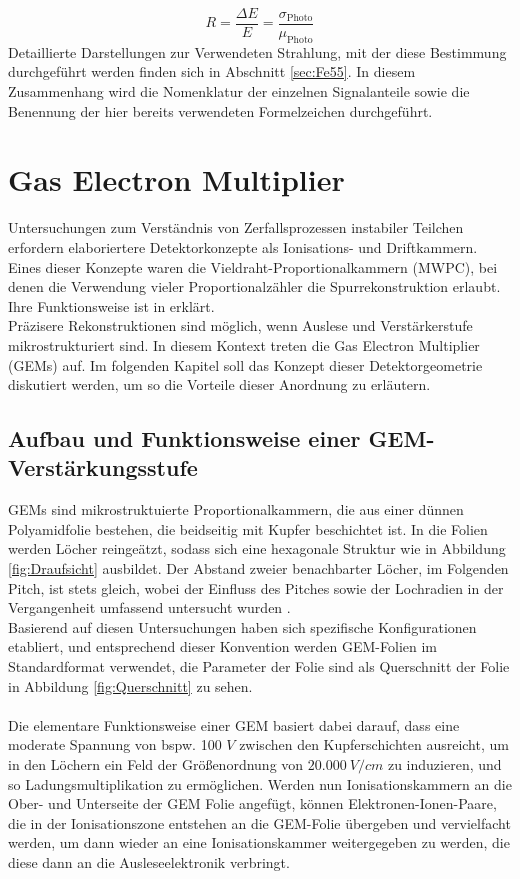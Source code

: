 				\begin{equation*}
					R=\frac{\Delta E}{E}= \frac{\sigma_{{\text{Photo}}}}{\mu_{\text{Photo}}}
				\end{equation*}
			Detaillierte Darstellungen zur Verwendeten Strahlung, mit der diese Bestimmung durchgeführt werden finden sich in Abschnitt  \ref{sec:Fe55}. In diesem Zusammenhang wird die Nomenklatur der einzelnen Signalanteile sowie die Benennung der hier bereits verwendeten Formelzeichen durchgeführt.
			
			

\chapter{Gas Electron Multiplier}
 Untersuchungen zum Verständnis von Zerfallsprozessen instabiler Teilchen erfordern elaboriertere Detektorkonzepte als Ionisations- und Driftkammern. Eines dieser Konzepte waren die Vieldraht-Proportionalkammern (MWPC), bei denen die Verwendung vieler Proportionalzähler die Spurrekonstruktion erlaubt. Ihre Funktionsweise ist in \cite{Sauli_Multiwire} erklärt.\\
 Präzisere Rekonstruktionen sind möglich, wenn Auslese und Verstärkerstufe mikrostrukturiert sind. In diesem Kontext treten die Gas Electron Multiplier (GEMs) auf. Im folgenden Kapitel soll das Konzept dieser Detektorgeometrie diskutiert werden, um so die Vorteile dieser Anordnung zu erläutern.

\section{Aufbau und Funktionsweise einer GEM-Verstärkungsstufe} 
  GEMs sind mikrostruktuierte Proportionalkammern, die aus einer dünnen Polyamidfolie bestehen, die beidseitig mit Kupfer beschichtet ist. In die Folien werden Löcher reingeätzt, sodass sich eine hexagonale Struktur wie in Abbildung  \ref{fig:Draufsicht} ausbildet. Der Abstand zweier benachbarter Löcher, im Folgenden Pitch, ist stets gleich, wobei der Einfluss des Pitches sowie der Lochradien in der Vergangenheit umfassend untersucht wurden \cite{Sauli_Übersicht}. \\
  Basierend auf diesen Untersuchungen haben sich spezifische Konfigurationen etabliert, und entsprechend dieser Konvention werden GEM-Folien im Standardformat verwendet, die Parameter der Folie sind als Querschnitt der Folie in Abbildung \ref{fig:Querschnitt} zu sehen.\\
  \\
  Die elementare Funktionsweise einer GEM basiert dabei darauf, dass eine moderate Spannung von bspw. 100 $\si{V}$ zwischen den Kupferschichten ausreicht, um in den Löchern ein Feld der Größenordnung von $20.000\ \si{V/cm}$ zu induzieren, und so Ladungsmultiplikation zu ermöglichen. Werden nun Ionisationskammern an  die Ober- und Unterseite der GEM Folie angefügt, können Elektronen-Ionen-Paare, die in der Ionisationszone entstehen an die GEM-Folie übergeben und vervielfacht werden, um dann wieder an eine Ionisationskammer weitergegeben zu werden, die diese dann an die Ausleseelektronik verbringt.


